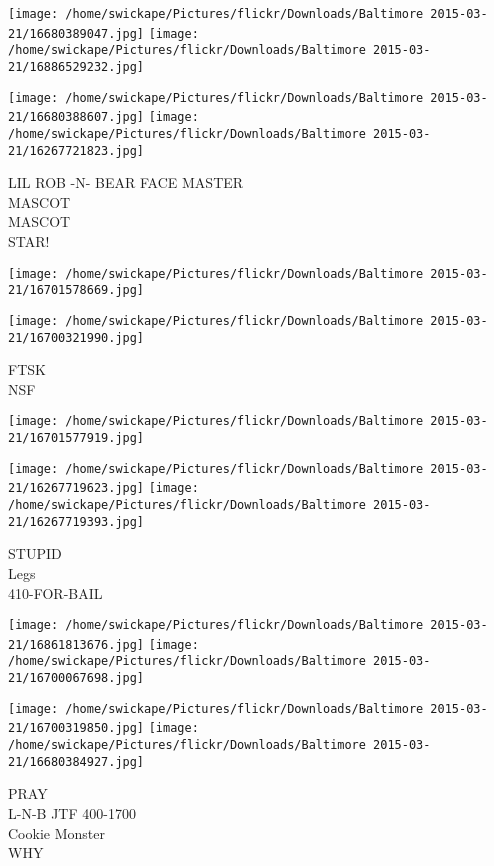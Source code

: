 \documentclass[10pt,letterpaper]{article}
\begin{document}
\texttt{[image: /home/swickape/Pictures/flickr/Downloads/Baltimore 2015-03-21/16680389047.jpg]}
\texttt{[image: /home/swickape/Pictures/flickr/Downloads/Baltimore 2015-03-21/16886529232.jpg]}

\texttt{[image: /home/swickape/Pictures/flickr/Downloads/Baltimore 2015-03-21/16680388607.jpg]}
\texttt{[image: /home/swickape/Pictures/flickr/Downloads/Baltimore 2015-03-21/16267721823.jpg]}

LIL ROB {-}N{-} BEAR FACE MASTER\\
MASCOT\\
MASCOT\\
STAR!\\
\pagebreak

\texttt{[image: /home/swickape/Pictures/flickr/Downloads/Baltimore 2015-03-21/16701578669.jpg]}

\vspace{0.25in}
\texttt{[image: /home/swickape/Pictures/flickr/Downloads/Baltimore 2015-03-21/16700321990.jpg]}

FTSK\\
NSF\\
\pagebreak

\texttt{[image: /home/swickape/Pictures/flickr/Downloads/Baltimore 2015-03-21/16701577919.jpg]}

\vspace{0.25in}
\texttt{[image: /home/swickape/Pictures/flickr/Downloads/Baltimore 2015-03-21/16267719623.jpg]}
\texttt{[image: /home/swickape/Pictures/flickr/Downloads/Baltimore 2015-03-21/16267719393.jpg]}

STUPID\\
Legs\\
410{-}FOR{-}BAIL\\
\pagebreak

\texttt{[image: /home/swickape/Pictures/flickr/Downloads/Baltimore 2015-03-21/16861813676.jpg]}
\texttt{[image: /home/swickape/Pictures/flickr/Downloads/Baltimore 2015-03-21/16700067698.jpg]}

\texttt{[image: /home/swickape/Pictures/flickr/Downloads/Baltimore 2015-03-21/16700319850.jpg]}
\texttt{[image: /home/swickape/Pictures/flickr/Downloads/Baltimore 2015-03-21/16680384927.jpg]}

PRAY\\
L{-}N{-}B JTF 400{-}1700\\
Cookie Monster\\
WHY\\
\pagebreak
\end{document}
